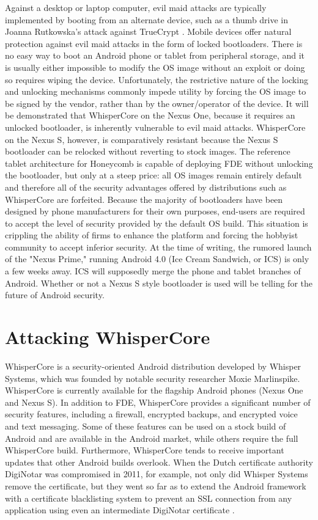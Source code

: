 Against a desktop or laptop computer, evil maid attacks are typically implemented by booting from an alternate device, such as a
thumb drive in Joanna Rutkowska's attack against TrueCrypt \cite{evilmaid}.  Mobile devices offer natural protection against evil
maid attacks in the form of locked bootloaders.  There is no easy way to boot an Android phone or tablet from peripheral storage,
and it is usually either impossible to modify the OS image without an exploit or doing so requires wiping the device.
Unfortunately, the restrictive nature of the locking and unlocking mechanisms commonly impede utility by forcing the OS image to be
signed by the vendor, rather than by the owner/operator of the device. It will be demonstrated that WhisperCore on the Nexus One,
because it requires an unlocked bootloader, is inherently vulnerable to evil maid attacks.  WhisperCore on the Nexus S, however, is
comparatively resistant because the Nexus S bootloader can be relocked without reverting to stock images.  The reference tablet
architecture for Honeycomb is capable of deploying FDE without unlocking the bootloader, but only at a steep price: all OS images
remain entirely default and therefore all of the security advantages offered by distributions such as WhisperCore are forfeited.
Because the majority of bootloaders have been designed by phone manufacturers for their own purposes, end-users are required to
accept the level of security provided by the default OS build.  This situation is crippling the ability of firms to enhance the
platform and forcing the hobbyist community to accept inferior security.  At the time of writing, the rumored launch of the "Nexus
Prime," running Android 4.0 (Ice Cream Sandwich, or ICS) is only a few weeks away.  ICS will supposedly merge the phone and tablet
branches of Android.  Whether or not a Nexus S style bootloader is used will be telling for the future of Android security. 

\section{Attacking WhisperCore}
WhisperCore is a security-oriented Android distribution developed by Whisper Systems, which was founded by notable security
researcher Moxie Marlinspike.  WhisperCore is currently available for the flagship Android phones (Nexus One and Nexus S). In
addition to FDE, WhisperCore provides a significant number of security features, including a firewall, encrypted backups, and
encrypted voice and text messaging.  Some of these features can be used on a stock build of Android and are available in the Android
market, while others require the full WhisperCore build.  Furthermore, WhisperCore tends to receive important updates that other
Android builds overlook. When the Dutch certificate authority DigiNotar was compromised in 2011, for example, not only did Whisper
Systems remove the certificate, but they went so far as to extend the Android framework with a certificate blacklisting system to
prevent an SSL connection from any application using even an intermediate DigiNotar certificate \cite{whispernotar}. 

